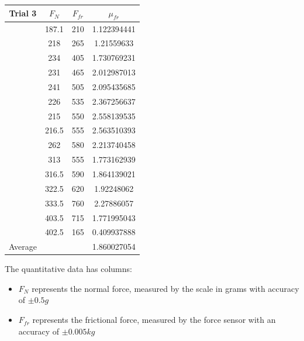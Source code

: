 \documentclass[12pt]{article}
\begin{document}
\begin{table}
    \begin{tabular} {| c c c c |}
        \hline
        Trial 3 & $F_{N}$   & $F_{fr}$  & $\mu_{fr}$    \\
        \hline
                & 187.1     & 210       & 1.122394441   \\
                & 218       & 265       & 1.21559633    \\
                & 234       & 405       & 1.730769231   \\
                & 231       & 465       & 2.012987013   \\
                & 241       & 505       & 2.095435685   \\
                & 226       & 535       & 2.367256637   \\
                & 215       & 550       & 2.558139535   \\
                & 216.5     & 555       & 2.563510393   \\
                & 262       & 580       & 2.213740458   \\
                & 313       & 555       & 1.773162939   \\
                & 316.5     & 590       & 1.864139021   \\
                & 322.5     & 620       & 1.92248062    \\
                & 333.5     & 760       & 2.27886057    \\
                & 403.5     & 715       & 1.771995043   \\
                & 402.5     & 165       & 0.409937888   \\
        \hline
        Average &           &           & 1.860027054   \\
        \hline
    \end{tabular}
\end{table}

The quantitative data has columns:

\begin{itemize}
    \item $F_{N}$ represents the normal force, measured by the scale in grams with accuracy of $\pm 0.5g$
    \item $F_{fr}$ represents the frictional force, measured by the force sensor with an accuracy of $\pm0.005kg$
\end{itemize}
\end{document}
